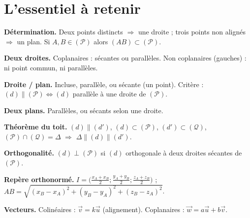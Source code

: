 \begin{illus}
\end{illus}

\section{L'essentiel à retenir}

\begin{synthese}
\textbf{Détermination.} Deux points distincts $\Rightarrow$ une droite ; trois points
non alignés $\Rightarrow$ un plan. Si $A,B\in(\mathcal{P})$ alors $(AB)\subset(\mathcal{P})$.

\smallskip
\textbf{Deux droites.} Coplanaires : sécantes ou parallèles. Non coplanaires
(gauches) : ni point commun, ni parallèles.

\smallskip
\textbf{Droite / plan.} Incluse, parallèle, ou sécante (un point). Critère :
$(d)\parallel(\mathcal{P})\iff (d)$ parallèle à une droite de $(\mathcal{P})$.

\smallskip
\textbf{Deux plans.} Parallèles, ou sécants selon une droite.

\smallskip
\textbf{Théorème du toit.} $(d)\parallel(d')$, $(d)\subset(\mathcal{P})$,
$(d')\subset(\mathcal{Q})$, $(\mathcal{P})\cap(\mathcal{Q})=\Delta$ $\Rightarrow$
$\Delta\parallel(d)\parallel(d')$.

\smallskip
\textbf{Orthogonalité.} $(d)\perp(\mathcal{P})$ si $(d)$ orthogonale à deux droites
sécantes de $(\mathcal{P})$.

\smallskip
\textbf{Repère orthonormé.} $I=\big(\tfrac{x_A+x_B}{2};\tfrac{y_A+y_B}{2};
\tfrac{z_A+z_B}{2}\big)$ ; $AB=\sqrt{(x_B-x_A)^2+(y_B-y_A)^2+(z_B-z_A)^2}$.

\smallskip
\textbf{Vecteurs.} Colinéaires : $\vec{v}=k\vec{u}$ (alignement). Coplanaires :
$\vec{w}=a\vec{u}+b\vec{v}$.
\end{synthese}

